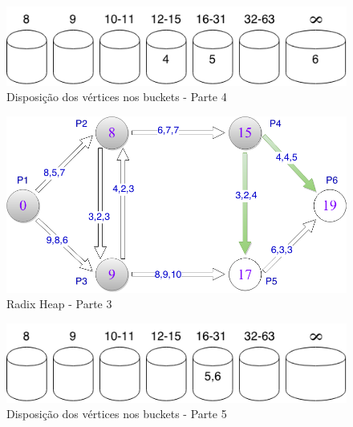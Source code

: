 \begin{figure}[htbp]
\centering
 \includegraphics[width=.50\textwidth]{figuras/buckets4.png}
\caption{Disposição dos vértices nos buckets - Parte 4}
\label{fig:buckets4}
\end{figure}
\FloatBarrier

\begin{figure}[htbp]
\centering
 \includegraphics[width=.50\textwidth]{figuras/limitesup3.png}
\caption{Radix Heap - Parte 3}
\label{fig:limitesup3}
\end{figure}

\begin{figure}[htbp]
\centering
 \includegraphics[width=.50\textwidth]{figuras/buckets5.png}
\caption{Disposição dos vértices nos buckets - Parte 5}
\label{fig:buckets5}
\end{figure}
\FloatBarrier


